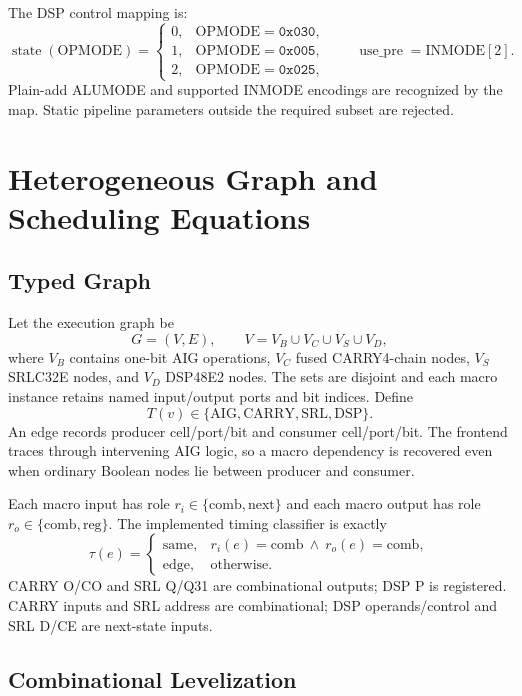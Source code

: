 \documentclass[11pt,a4paper]{article}
\begin{document}
The DSP control mapping is:
\[
  \operatorname{state}(\mathrm{OPMODE})=
  \begin{cases}
     0,&\mathrm{OPMODE}=\mathtt{0x030},\\
     1,&\mathrm{OPMODE}=\mathtt{0x005},\\
     2,&\mathrm{OPMODE}=\mathtt{0x025},
  \end{cases}
  \qquad
  \operatorname{use\_pre}=\mathrm{INMODE}[2].
\]
Plain-add ALUMODE and supported INMODE encodings are recognized by the map.
Static pipeline parameters outside the required subset are rejected.

\section{Heterogeneous Graph and Scheduling Equations}

\subsection{Typed Graph}

Let the execution graph be
\[
  G=(V,E),\qquad
  V=V_B\cup V_C\cup V_S\cup V_D,
\]
where $V_B$ contains one-bit AIG operations, $V_C$ fused CARRY4-chain nodes,
$V_S$ SRLC32E nodes, and $V_D$ DSP48E2 nodes.  The sets are disjoint and each
macro instance retains named input/output ports and bit indices.  Define
\[
  T(v)\in\{\mathrm{AIG},\mathrm{CARRY},\mathrm{SRL},\mathrm{DSP}\}.
\]
An edge records producer cell/port/bit and consumer cell/port/bit.  The frontend
traces through intervening AIG logic, so a macro dependency is recovered even
when ordinary Boolean nodes lie between producer and consumer.

Each macro input has role $r_i\in\{\mathrm{comb},\mathrm{next}\}$ and each
macro output has role $r_o\in\{\mathrm{comb},\mathrm{reg}\}$.  The implemented
timing classifier is exactly
\[
 \tau(e)=
 \begin{cases}
  \mathrm{same}, & r_i(e)=\mathrm{comb}\ \land\ r_o(e)=\mathrm{comb},\\
  \mathrm{edge}, & \text{otherwise}.
 \end{cases}
\]
CARRY O/CO and SRL Q/Q31 are combinational outputs; DSP P is registered.
CARRY inputs and SRL address are combinational; DSP operands/control and SRL
D/CE are next-state inputs.

\subsection{Combinational Levelization}
\end{document}
